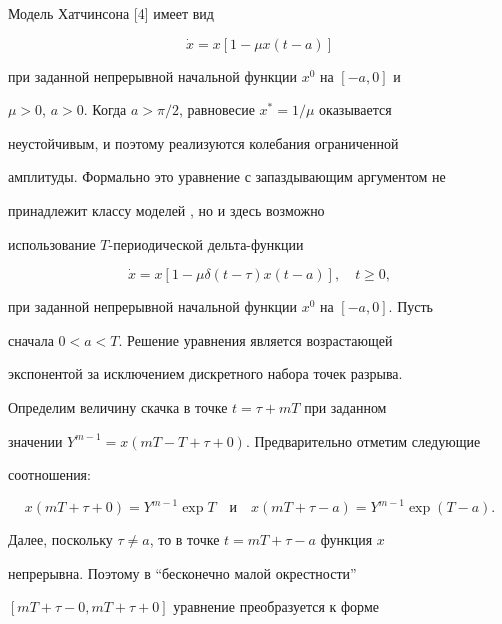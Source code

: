 \begin{exam} Модель Хатчинсона [4] имеет вид


\begin{equation}


\Dot x=x[1-\mu x(t-a)]


\label{1.8}


\end{equation}


при заданной непрерывной начальной функции $x^0$ на $[-a,0]$ и 


$\mu>0$, $a>0$. Когда $a>\pi/2$, равновесие $x^*=1/\mu$ оказывается 


неустойчивым, и поэтому реализуются колебания ограниченной 


амплитуды. Формально это уравнение с запаздывающим аргументом не 


принадлежит классу моделей , но и здесь возможно 


использование $T$-периодической дельта-функции


\begin{equation}


\Dot x=x[1-\mu\delta(t-\tau)x(t-a)],\quad t\geqslant 0,


\label{1.9}


\end{equation}


при заданной непрерывной начальной функции $x^0$ на $[-a,0]$. Пусть


сначала $0<a<T$. Решение уравнения  является возрастающей 


экспонентой за исключением дискретного набора точек разрыва. 


Определим величину скачка в точке $t=\tau+mT$ при заданном 


значении $Y^{m-1}=x(mT-T+\tau+0)$. Предварительно отметим следующие 


соотношения:


$$


x(mT+\tau+0)=Y^{m-1}\exp T\quad\text{и}\quad


x(mT+\tau-a)=Y^{m-1}\exp(T-a).


$$


Далее, поскольку $\tau\ne a$, то в точке $t=mT+\tau-a$ функция $x$ 


непрерывна. Поэтому в ``бесконечно малой окрестности''


$[mT+\tau-0,mT+\tau+0]$ уравнение  преобразуется к форме


$$



\end{exam}
